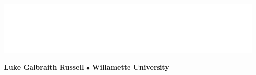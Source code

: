 \documentclass{fancyslides}
\begin{document}


\begin{frame}

\begin{center}
	\includegraphics[scale=.23]{title.png}
\end{center}

\begin{center}
\textcolor{newhopeblue}{\Large \textbf{Luke Galbraith Russell} $\bullet$ \textbf{Willamette University}}
\end{center}
\end{frame}


\end{document}
